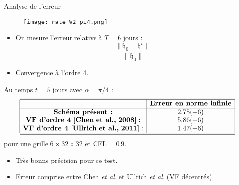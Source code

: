 \documentclass[11pt]{beamer}
\begin{document}
\begin{frame}{Analyse de l'erreur}
\begin{figure}
\texttt{[image: rate\_W2\_pi4.png]}
\end{figure}
\begin{itemize}
\item  On mesure l'erreur relative à $T=6$ jours  :
$$
\dfrac{\| \mathfrak{h}_0 - \mathfrak{h}^n \|}{\| \mathfrak{h}_0 \|}
$$
\item Convergence à l'ordre 4.
\end{itemize}
\end{frame}








\begin{frame}{}
Au temps $t = 5$ jours avec $\alpha = \pi/4$ :
\begin{equation*}
\begin{array}{|c|c|}
\hline
\hline
 & \textbf{Erreur en norme infinie} \\
\hline
 \textbf{Schéma présent :} & 2.75 (-6) \\
 \textbf{VF d'ordre 4 [Chen et al., 2008]} : & 5.86 (-6) \\
 \textbf{VF d'ordre 4 [Ullrich et al., 2011]} : & 1.47 (-6) \\
\hline
\hline
\end{array}
\end{equation*}
pour une grille $6 \times 32 \times 32$ et CFL$=0.9$.
\begin{block}{}
\begin{itemize}
\item Très bonne précision pour ce test.
\item Erreur comprise entre Chen \textit{et al.} et Ullrich \textit{et al.} (VF décentrés).
\end{itemize}
\end{block}
\end{frame}







\end{document}
